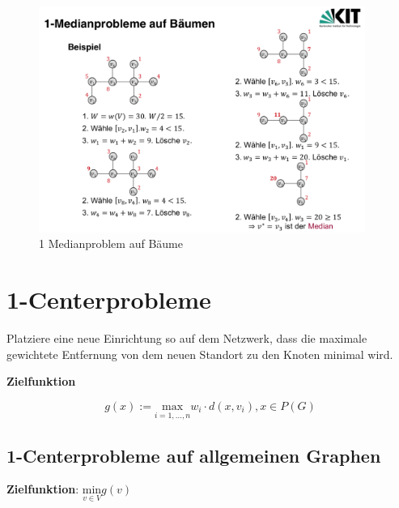      \begin{figure}[H]
        \centering
        \includegraphics[width=0.95\textwidth]{Images/1_Medianproblem_auf_Baeume_Bsp.png}
        \caption{1 Medianproblem auf Bäume}
        \label{fig:1_Medianproblem_auf_Baeume_Bsp}
      \end{figure}
  

  \section{1-Centerprobleme} %
  \label{sec:1_centerprobleme}

    \par Platziere eine neue Einrichtung so auf dem Netzwerk, dass die maximale gewichtete Entfernung von dem neuen Standort zu den Knoten minimal wird.

    \par \textbf{Zielfunktion}

    \[
      g(x) := \underset{i= 1, \dots, n}{\text{max}}w_i\cdot d(x, v_i), x \in P(G)
    \]
  
    \subsection{1-Centerprobleme auf allgemeinen Graphen} %
    \label{sub:1_centerprobleme_auf_allgemeinen_graphen}

      \par \textbf{Zielfunktion}: $\underset{v \in V}{\text{min}}g(v)$


